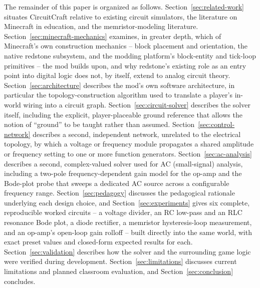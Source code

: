The remainder of this paper is organized as follows. Section~\ref{sec:related-work}
situates CircuitCraft relative to existing circuit simulators, the literature on
Minecraft in education, and the memristor-modeling literature. Section~\ref{sec:minecraft-mechanics}
examines, in greater depth, which of Minecraft's own construction mechanics -- block
placement and orientation, the native redstone subsystem, and the modding platform's
block-entity and tick-loop primitives -- the mod builds upon, and why redstone's existing
role as an entry point into digital logic does not, by itself, extend to analog circuit
theory. Section~\ref{sec:architecture} describes the mod's own software architecture, in
particular the topology-construction algorithm used to translate a player's in-world wiring
into a circuit graph. Section~\ref{sec:circuit-solver} describes the solver itself,
including the explicit, player-placeable ground reference that allows the notion of
``ground'' to be taught rather than assumed. Section~\ref{sec:control-network} describes a
second, independent network, unrelated to the electrical topology, by which a voltage or
frequency module propagates a shared amplitude or frequency setting to one or more function
generators. Section~\ref{sec:ac-analysis} describes a second, complex-valued solver used for
AC (small-signal) analysis, including a two-pole frequency-dependent gain model for the
op-amp and the Bode-plot probe that sweeps a dedicated AC source across a configurable
frequency range. Section~\ref{sec:pedagogy} discusses the
pedagogical rationale underlying each design choice, and Section~\ref{sec:experiments} gives
six complete, reproducible worked circuits -- a voltage divider, an RC low-pass and an RLC
resonance Bode plot, a diode rectifier, a memristor hysteresis-loop measurement, and an
op-amp's open-loop gain rolloff -- built directly
into the same world, with exact preset values and closed-form expected results for each.
Section~\ref{sec:validation} describes
how the solver and the surrounding game logic were verified during development.
Section~\ref{sec:limitations} discusses current limitations and planned classroom
evaluation, and Section~\ref{sec:conclusion} concludes.
